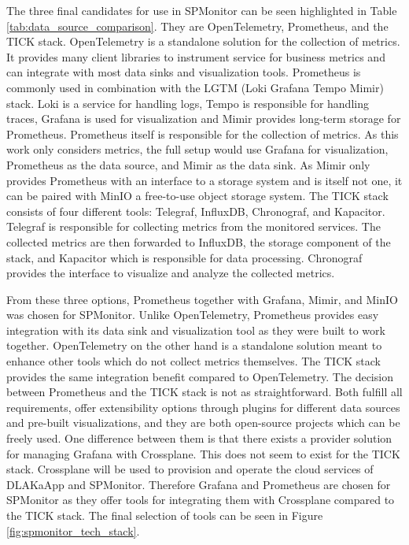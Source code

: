 The three final candidates for use in SPMonitor can be seen highlighted in Table \ref{tab:data_source_comparison}.
They are OpenTelemetry, Prometheus, and the TICK stack.
OpenTelemetry is a standalone solution for the collection of metrics. 
It provides many client libraries to instrument service for business metrics and can integrate
with most data sinks and visualization tools.
Prometheus is commonly used in combination with the LGTM (Loki Grafana Tempo Mimir) stack.
Loki is a service for handling logs, Tempo is responsible for handling traces, Grafana is used for visualization and Mimir provides
long-term storage for Prometheus. Prometheus itself is responsible for the collection of metrics.
As this work only considers metrics, the full setup would use Grafana for visualization, Prometheus as the data source, and Mimir
as the data sink. As Mimir only provides Prometheus with an interface to a storage system and is itself not one, it can be paired with MinIO
a free-to-use object storage system.
The TICK stack consists of four different tools: Telegraf, InfluxDB, Chronograf, and Kapacitor.
Telegraf is responsible for collecting metrics from the monitored services. The collected metrics are then forwarded
to InfluxDB, the storage component of the stack, and Kapacitor which is responsible for data processing.
Chronograf provides the interface to visualize and analyze the collected metrics.

From these three options, Prometheus together with Grafana, Mimir, and MinIO was chosen for SPMonitor.
Unlike OpenTelemetry, Prometheus provides easy integration with its data sink and visualization tool as
they were built to work together. OpenTelemetry on the other hand is a standalone solution meant to enhance
other tools which do not collect metrics themselves. The TICK stack provides the same integration benefit compared
to OpenTelemetry. The decision between Prometheus and the TICK stack is not as straightforward.
Both fulfill all requirements, offer extensibility options through plugins for different data sources
and pre-built visualizations, and they are both open-source projects which can be freely used.
One difference between them is that there exists a provider solution for managing Grafana with Crossplane.
This does not seem to exist for the TICK stack. Crossplane will be used to provision and operate the cloud
services of \Gls{DLAKaApp} and SPMonitor. Therefore Grafana and Prometheus are chosen for SPMonitor as they offer tools
for integrating them with Crossplane compared to the TICK stack. The final selection of tools can be seen in Figure \ref{fig:spmonitor_tech_stack}.

